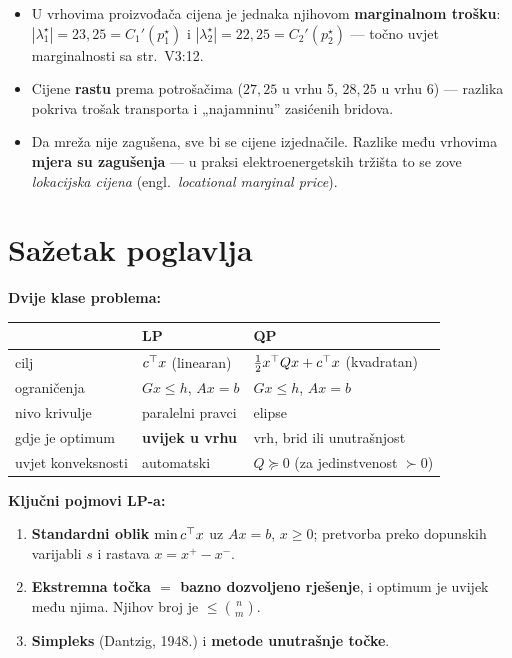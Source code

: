\begin{zadatak}
\begin{itemize}
  \item U vrhovima proizvođača cijena je jednaka njihovom \textbf{marginalnom
        trošku}: $|\lambda_1^\star| = 23{,}25 = C_1'(p_1^\star)$ i
        $|\lambda_2^\star| = 22{,}25 = C_2'(p_2^\star)$ --- točno uvjet
        marginalnosti sa str.\ V3:12. \checkmark
  \item Cijene \textbf{rastu} prema potrošačima ($27{,}25$ u vrhu 5, $28{,}25$
        u vrhu 6) --- razlika pokriva trošak transporta i „najamninu” zasićenih
        bridova.
  \item Da mreža nije zagušena, sve bi se cijene izjednačile. Razlike među
        vrhovima \textbf{mjera su zagušenja} --- u praksi elektroenergetskih
        tržišta to se zove \emph{lokacijska cijena} (engl.\ \emph{locational
        marginal price}).
\end{itemize}
\end{zadatak}

\section{Sažetak poglavlja}

\textbf{Dvije klase problema:}

\begin{center}
\begin{tabular}{P{3.0cm}P{4.8cm}P{5.0cm}}
\toprule
& \textbf{LP} & \textbf{QP} \\
\midrule
cilj & $c^{\top} x$ (linearan) & $\tfrac12x^{\top} Qx + c^{\top} x$ (kvadratan) \\
ograničenja & $Gx\le h$, $Ax=b$ & $Gx\le h$, $Ax=b$ \\
nivo krivulje & paralelni pravci & elipse \\
gdje je optimum & \textbf{uvijek u vrhu} & vrh, brid ili unutrašnjost \\
uvjet konveksnosti & automatski & $Q \succeq 0$ (za jedinstvenost $\succ 0$) \\
\bottomrule
\end{tabular}
\end{center}

\textbf{Ključni pojmovi LP-a:}

\begin{enumerate}
  \item \textbf{Standardni oblik} $\min c^{\top} x$ uz $Ax=b$, $x\ge0$; pretvorba
        preko dopunskih varijabli $s$ i rastava $x = x^+ - x^-$.
  \item \textbf{Ekstremna točka $=$ bazno dozvoljeno rješenje}, i optimum je
        uvijek među njima. Njihov broj je $\le \binom{n}{m}$.
  \item \textbf{Simpleks} (Dantzig, 1948.) i \textbf{metode unutrašnje točke}.
\end{enumerate}

